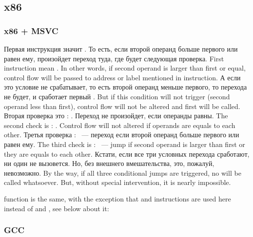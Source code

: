 ﻿\subsection{x86}

\subsubsection{x86 + MSVC}




\IFRU
{Первая инструкция \JLE значит . То есть, если второй операнд больше первого или 
равен ему, произойдет переход туда, где будет следующая проверка.}
{First instruction \JLE mean . In other words, if second operand is 
larger than first or equal, control flow will be passed to address or label mentioned in instruction.}
\IFRU
{А если это условие не срабатывает, то есть второй операнд меньше первого, то перехода не будет, 
и сработает первый \printf.}
{But if this condition will not trigger (second operand less than first), control flow will 
not be altered and first \printf will be called.}
\IFRU
{Вторая проверка это \JNE: . Переход не произойдет, если операнды равны.}
{The second check is \JNE: . Control flow will not altered if operands are 
equals to each other.}
\IFRU
{Третья проверка \JGE:  ~--- переход если второй операнд больше 
первого или равен ему.}
{The third check is \JGE:  ~--- jump if second operand is larger 
than first or they are equals to each other.}
\IFRU
{Кстати, если все три условных перехода сработают, ни один \printf не вызовется. 
Но, без внешнего вмешательства, это, пожалуй, невозможно.}
{By the way, if all three conditional jumps are triggered, no \printf will be called whatsoever. 
But, without special intervention, it is nearly impossible.}

 
{function is the same, with the exception that \JBE and \JAE instructions are used here instead of \JLE and \JGE,
see below about it:}

\subsubsection{GCC}

